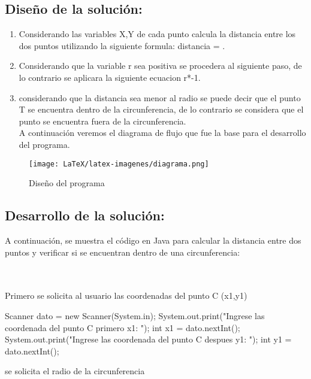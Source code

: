 \subsection{\textbf{Diseño de la solución:}}
\begin{enumerate}[label=\textbf{\arabic*.}]

  \item Considerando las variables X,Y de cada punto calcula la distancia entre los dos puntos utilizando la siguiente formula: {distancia} = .

  \item  Considerando que la variable r sea positiva se procedera al siguiente paso, de lo contrario se aplicara la siguiente ecuacion r*-1.
  \item considerando que la distancia sea menor al radio se puede decir que el punto T se encuentra dentro de la circunferencia, de lo contrario se considera que el punto se encuentra fuera de la circunferencia. 
  \\
  A continuación veremos el diagrama de flujo que fue la base para el desarrollo del programa.
\end{enumerate}
\begin{figure}[H]
    \centering
    \texttt{[image: LaTeX/latex-imagenes/diagrama.png]}
    \caption{Diseño del programa}
    \label{fig:imagen7}
\end{figure}


\subsection{\textbf{Desarrollo de la solución:}}
A continuación, se muestra el código en Java para calcular la distancia entre dos puntos y verificar si se encuentran dentro de una circunferencia:


  \\
  \\
  
        Primero se solicita al usuario las coordenadas del punto C (x1,y1)
       \begin{javaCode}
        Scanner dato = new Scanner(System.in);
        System.out.print("Ingrese las coordenada del punto C primero x1: ");
        int x1 = dato.nextInt();
        System.out.print("Ingrese las coordenada del punto C despues  y1: ");
        int y1 = dato.nextInt();
         \end{javaCode}
         se solicita el radio de la circunferencia
       
